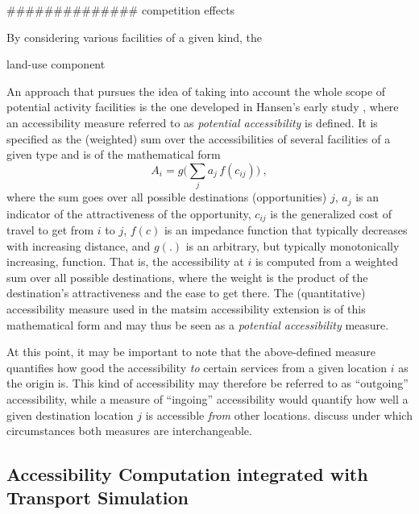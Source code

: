 ############## competition effects

By considering various 
facilities of a given kind, the 

land-use component

An approach that pursues the idea of taking into account the whole scope of potential activity facilities is the one 
developed in Hansen's early study \citep{Hansen1959}, where an accessibility 
measure referred to as \textit{potential accessibility} is defined. It is specified as the (weighted) sum over the 
accessibilities of several facilities of a given type and is of the mathematical form
\begin{equation}
	A_i = g\Big( \sum_j a_j \, f(c_{ij}) \Big) \ ,
	\label{eq:accessibility:basic}
\end{equation}
where the sum goes over all possible destinations (opportunities) $j$, $a_j$ is an indicator of the attractiveness of 
the opportunity, $c_{ij}$ is the generalized cost of travel to get from $i$ to $j$, $f(c)$ is an impedance function that 
typically decreases with increasing distance, and $g(.)$ is an arbitrary, but typically monotonically increasing, function. 
That is, the accessibility at $i$ is computed from a weighted sum over all possible destinations, where the weight is the 
product of the destination's attractiveness and the ease to get there. The (quantitative) accessibility measure used 
in the \gls{matsim} accessibility extension is of this mathematical form and may thus be seen 
as a \textit{potential accessibility} measure.

At this point, it may be important to note that the above-defined measure quantifies how good the accessibility \textit{to} 
certain services from a given location $i$ as the origin is. This kind of accessibility may therefore be referred to 
as ``outgoing'' accessibility, while a measure of ``ingoing'' accessibility would quantify how well a given destination 
location $j$ is accessible \textit{from} other locations. \citet{NicolaiNagel2012HiResAccessibilityMethodInBook} 
discuss under which circumstances both measures are interchangeable.


\subsection{Accessibility Computation integrated with Transport Simulation}


